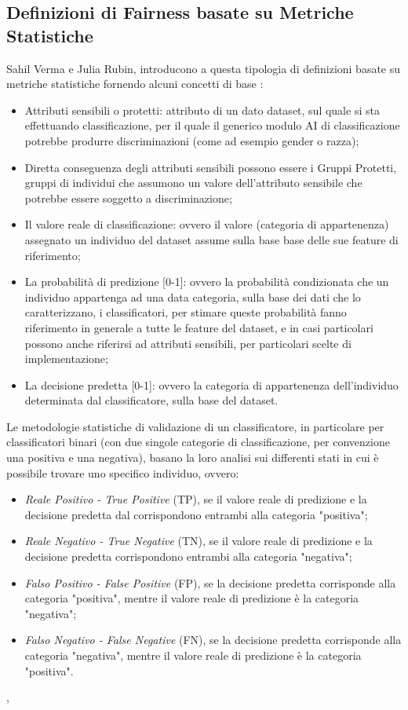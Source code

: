  \subsection{Definizioni di Fairness basate su Metriche Statistiche}
  Sahil Verma e Julia Rubin, introducono a questa tipologia di definizioni basate su metriche statistiche fornendo alcuni concetti di base \cite{FairnessDefinitionExplained}: 
 \begin{itemize}
     \item Attributi sensibili o protetti: attributo di un dato dataset, sul quale si sta effettuando classificazione, per il quale il generico modulo AI di classificazione potrebbe produrre discriminazioni (come ad esempio gender o razza);
     \item Diretta conseguenza degli attributi sensibili possono essere i Gruppi Protetti, gruppi di individui che assumono un valore dell'attributo sensibile che potrebbe essere soggetto a discriminazione;
     \item Il valore reale di classificazione: ovvero il valore (categoria di appartenenza) assegnato un individuo del dataset assume sulla base base delle sue feature di riferimento;
     \item La probabilità di predizione [0-1]: ovvero la probabilità condizionata che un individuo appartenga ad una data categoria, sulla base dei dati che lo caratterizzano, i classificatori, per stimare queste probabilità fanno riferimento in generale a tutte le feature del dataset, e in casi particolari possono anche riferirsi ad attributi sensibili, per particolari scelte di implementazione;
     \item La decisione predetta [0-1]: ovvero la categoria di appartenenza dell'individuo determinata dal classificatore, sulla base del dataset.
 \end{itemize}
 
 Le metodologie statistiche di validazione di un classificatore, in particolare per classificatori binari (con due singole categorie di classificazione, per convenzione una positiva e una negativa), basano la loro analisi sui differenti stati in cui è possibile trovare uno specifico individuo, ovvero:
 
 \begin{itemize}
     \item \emph{Reale Positivo - True Positive} (TP), se il valore reale di predizione e la decisione predetta dal corrispondono entrambi alla categoria "positiva";
     \item \emph{Reale Negativo - True Negative} (TN), se il valore reale di predizione e la decisione predetta corrispondono entrambi alla categoria "negativa";
     \item \emph{Falso Positivo - False Positive} (FP), se la decisione predetta corrisponde alla categoria "positiva", mentre il valore reale di predizione è la categoria "negativa";
    \item \emph{Falso Negativo - False Negative} (FN), se la decisione predetta corrisponde alla categoria "negativa", mentre il valore reale di predizione è la categoria "positiva".
 \end{itemize}, 
 
